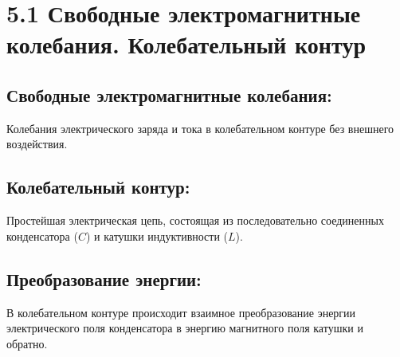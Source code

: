 \documentclass[a4paper,12pt]{article}
\begin{document}
\begin{center}
\end{center}

\vspace{-2.5em}








\section*{5.1 Свободные электромагнитные колебания. Колебательный контур}
\vspace{-9pt}
\subsection*{Свободные электромагнитные колебания:}
\vspace{-3pt}
Колебания электрического заряда и тока в колебательном контуре без внешнего воздействия.

\vspace{-9pt}
\subsection*{Колебательный контур:}
\vspace{-3pt}
Простейшая электрическая цепь, состоящая из последовательно соединенных конденсатора ($C$) и катушки индуктивности ($L$).

\vspace{-9pt}
\subsection*{Преобразование энергии:}
\vspace{-3pt}
В колебательном контуре происходит взаимное преобразование энергии электрического поля конденсатора в энергию магнитного поля катушки и обратно.
\end{document}
